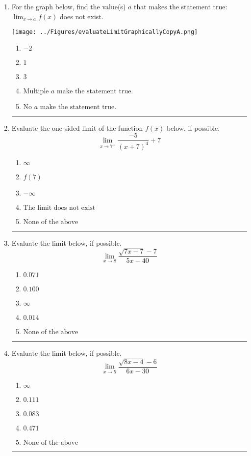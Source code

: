 \documentclass[14pt]{extbook}
\newcommand{\litem}[1]{\item#1\hspace*{-1cm}\rule{\textwidth}{0.4pt}}
\begin{document}
\begin{enumerate}
\litem{
For the graph below, find the value(s) $a$ that makes the statement true: $ \displaystyle \lim_{x \rightarrow a} f(x)$ does not exist.
\begin{center}
    \texttt{[image: ../Figures/evaluateLimitGraphicallyCopyA.png]}
\end{center}
\begin{enumerate}[label=\Alph*.]
\item \( -2 \)
\item \( 1 \)
\item \( 3 \)
\item \( \text{Multiple } a \text{ make the statement true}. \)
\item \( \text{No } a \text{ make the statement true}. \)

\end{enumerate} }
\litem{
Evaluate the one-sided limit of the function $f(x)$ below, if possible.\[ \lim_{x \rightarrow 7^+} \frac{-5}{(x+7)^4}+7 \]\begin{enumerate}[label=\Alph*.]
\item \( \infty \)
\item \( f(7) \)
\item \( -\infty \)
\item \( \text{The limit does not exist} \)
\item \( \text{None of the above} \)

\end{enumerate} }
\litem{
Evaluate the limit below, if possible.\[ \lim_{x \rightarrow 8} \frac{\sqrt{7x - 7} - 7}{5x - 40} \]\begin{enumerate}[label=\Alph*.]
\item \( 0.071 \)
\item \( 0.100 \)
\item \( \infty \)
\item \( 0.014 \)
\item \( \text{None of the above} \)

\end{enumerate} }
\litem{
Evaluate the limit below, if possible.\[ \lim_{x \rightarrow 5} \frac{\sqrt{8x - 4} - 6}{6x - 30} \]\begin{enumerate}[label=\Alph*.]
\item \( \infty \)
\item \( 0.111 \)
\item \( 0.083 \)
\item \( 0.471 \)
\item \( \text{None of the above} \)


\end{enumerate}}
\end{enumerate}
\end{document}
